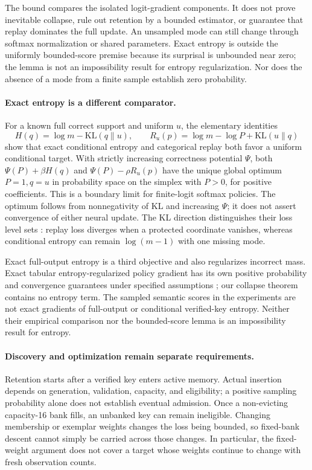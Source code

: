 \documentclass{article}
\newcommand{\1}{\mathbf 1}
\theoremstyle{remark}
\theoremstyle{definition}
\theoremstyle{plain}
\begin{document}
The bound compares the isolated logit-gradient components. It does not prove
inevitable collapse, rule out retention by a bounded estimator, or guarantee
that replay dominates the full update. An unsampled mode can still change
through softmax normalization or shared parameters. Exact entropy is outside
the uniformly bounded-score premise because its surprisal is unbounded near
zero; the lemma is not an impossibility result for entropy regularization.
Nor does the absence of a mode from a finite sample establish zero probability.

\paragraph{Exact entropy is a different comparator.}
For a known full correct support and uniform $u$, the elementary identities
\[
 H(q)=\log m-\mathrm{KL}(q\|u),\qquad
 R_u(p)=\log m-\log P+\mathrm{KL}(u\|q)
\]
show that exact conditional entropy and categorical replay both favor a
uniform conditional target. With strictly increasing correctness potential
$\Psi$, both $\Psi(P)+\beta H(q)$ and $\Psi(P)-\rho R_u(p)$ have the unique
global optimum $P=1,q=u$ in probability space on the simplex with $P>0$,
for positive coefficients. This is a boundary limit for finite-logit softmax
policies. The optimum follows from nonnegativity of KL and increasing
$\Psi$; it does not assert convergence of either neural update. The KL direction distinguishes their
loss level sets \citep{pereyra2017confidencepenalty,agarwal2021policygradient}:
replay loss diverges when a protected coordinate vanishes, whereas
conditional entropy can remain $\log(m-1)$ with one missing mode.

Exact full-output entropy is a third objective and also regularizes incorrect
mass. Exact tabular entropy-regularized policy gradient has its own positive
probability and convergence guarantees under specified assumptions
\citep{mei2020softmaxpg}; our collapse theorem contains no entropy term.
The sampled semantic scores in the experiments are not exact gradients of
full-output or conditional verified-key entropy. Neither their empirical
comparison nor the bounded-score lemma is an impossibility result for entropy.

\paragraph{Discovery and optimization remain separate requirements.}
Retention starts after a verified key enters active memory. Actual insertion
depends on generation, validation, capacity, and eligibility; a positive
sampling probability alone does not establish eventual admission. Once a
non-evicting capacity-16 bank fills, an unbanked key can remain ineligible.
Changing membership or exemplar weights changes the loss being bounded, so
fixed-bank descent cannot simply be carried across those changes. In
particular, the fixed-weight argument does not cover a target whose weights
continue to change with fresh observation counts.
\end{document}
